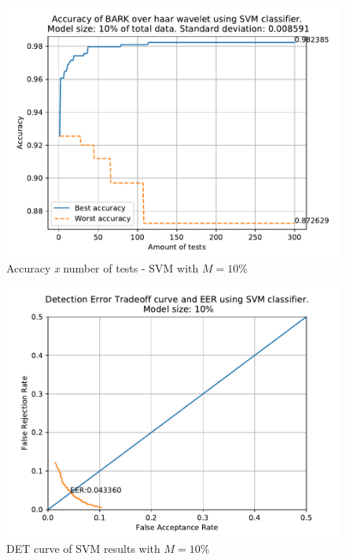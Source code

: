 		\begin{figure}[H]
			\centering
			\includegraphics[scale=.8]{images/results/confusionMatrices/classifier_SVM_10.pdf}
			\caption{Accuracy \textit{x} number of tests - SVM with $M=10\%$}
			\label{fig:classifiersvm10}
		\end{figure}
		\begin{figure}[H]
			\centering
			\includegraphics[scale=.8]{images/results/det/DET_for_classifier_SVM_10.pdf}
			\caption{DET curve of SVM results with $M=10\%$}
			\label{fig:detsvm10}
		\end{figure}
